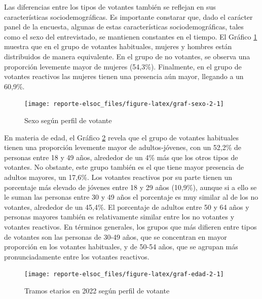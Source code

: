 \documentclass[
  12pt,
]{book}
\begin{document}
Las diferencias entre los tipos de votantes también se reflejan en sus características sociodemográficas. Es importante constarar que, dado el carácter panel de la encuesta, algunas de estas características sociodemográficas, tales como el sexo del entrevistado, se mantienen constantes en el tiempo. El Gráfico \ref{fig:graf-sexo-2} muestra que en el grupo de votantes habituales, mujeres y hombres están distribuidos de manera equivalente. En el grupo de no votantes, se observa una proporción levemente mayor de mujeres (54,3\%). Finalmente, en el grupo de votantes reactivos las mujeres tienen una presencia aún mayor, llegando a un 60,9\%.

\begin{figure}

{\centering \texttt{[image: reporte-elsoc\_files/figure-latex/graf-sexo-2-1]} 

}

\caption{Sexo según perfil de votante}\label{fig:graf-sexo-2}
\end{figure}

En materia de edad, el Gráfico \ref{fig:graf-edad-2} revela que el grupo de votantes habituales tienen una proporción levemente mayor de adultos-jóvenes, con un 52,2\% de personas entre 18 y 49 años, alrededor de un 4\% más que los otros tipos de votantes. No obstante, este grupo también es el que tiene mayor presencia de adultos mayores, un 17,6\%. Los votantes reactivos por su parte tienen un porcentaje más elevado de jóvenes entre 18 y 29 años (10,9\%), aunque si a ello se le suman las personas entre 30 y 49 años el porcentaje es muy similar al de los no votantes, alrededor de un 45,4\%. El porcentaje de adultos entre 50 y 64 años y personas mayores también es relativamente similar entre los no votantes y votantes reactivos. En términos generales, los grupos que más difieren entre tipos de votantes son las personas de 30-49 años, que se concentran en mayor proporción en los votantes habituales, y de 50-54 años, que se agrupan más pronunciadamente entre los votantes reactivos.

\begin{figure}

{\centering \texttt{[image: reporte-elsoc\_files/figure-latex/graf-edad-2-1]} 

}

\caption{Tramos etarios en 2022 según perfil de votante}\label{fig:graf-edad-2}
\end{figure}
\end{document}

